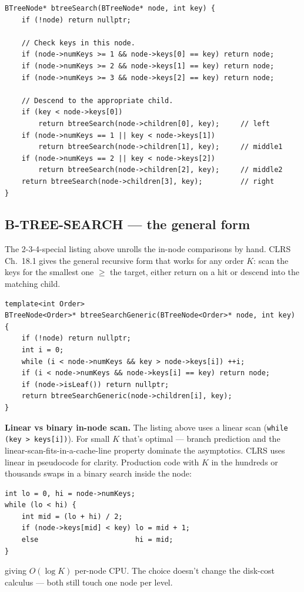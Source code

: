 \documentclass[11pt]{article}
\begin{document}
\begin{lstlisting}[basicstyle=\ttfamily\small,frame=single]
BTreeNode* btreeSearch(BTreeNode* node, int key) {
    if (!node) return nullptr;

    // Check keys in this node.
    if (node->numKeys >= 1 && node->keys[0] == key) return node;
    if (node->numKeys >= 2 && node->keys[1] == key) return node;
    if (node->numKeys >= 3 && node->keys[2] == key) return node;

    // Descend to the appropriate child.
    if (key < node->keys[0])
        return btreeSearch(node->children[0], key);     // left
    if (node->numKeys == 1 || key < node->keys[1])
        return btreeSearch(node->children[1], key);     // middle1
    if (node->numKeys == 2 || key < node->keys[2])
        return btreeSearch(node->children[2], key);     // middle2
    return btreeSearch(node->children[3], key);         // right
}
\end{lstlisting}

\subsection*{B-TREE-SEARCH --- the general form}

The 2-3-4-special listing above unrolls the in-node comparisons by
hand. CLRS Ch.~18.1 gives the general recursive form that works for
any order $K$: scan the keys for the smallest one $\ge$ the target,
either return on a hit or descend into the matching child.

\begin{lstlisting}[basicstyle=\ttfamily\small,frame=single]
template<int Order>
BTreeNode<Order>* btreeSearchGeneric(BTreeNode<Order>* node, int key) {
    if (!node) return nullptr;
    int i = 0;
    while (i < node->numKeys && key > node->keys[i]) ++i;
    if (i < node->numKeys && node->keys[i] == key) return node;
    if (node->isLeaf()) return nullptr;
    return btreeSearchGeneric(node->children[i], key);
}
\end{lstlisting}

\begin{notebox}
\textbf{Linear vs binary in-node scan.} The listing above uses a
linear scan (\texttt{while (key > keys[i])}). For small $K$ that's
optimal --- branch prediction and the linear-scan-fits-in-a-cache-line
property dominate the asymptotics. CLRS uses linear in pseudocode for
clarity. Production code with $K$ in the hundreds or thousands swaps
in a binary search inside the node:
\begin{lstlisting}[basicstyle=\ttfamily\small,frame=single]
int lo = 0, hi = node->numKeys;
while (lo < hi) {
    int mid = (lo + hi) / 2;
    if (node->keys[mid] < key) lo = mid + 1;
    else                       hi = mid;
}
\end{lstlisting}
giving $O(\log K)$ per-node CPU. The choice doesn't change the
disk-cost calculus --- both still touch one node per level.
\end{notebox}
\end{document}
